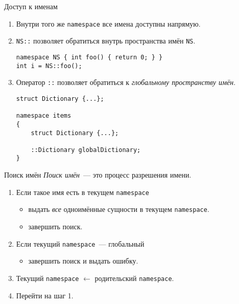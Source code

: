 \documentclass[aspectration=1610,t]{beamer}
\begin{document}
\begin{frame}[fragile]{Доступ к именам}
    \begin{enumerate}
        \item Внутри того же \texttt{namespace} все имена доступны напрямую.

        \pause\item \texttt{NS::} позволяет обратиться внутрь пространства
            имён \texttt{NS}.
    \begin{lstlisting}
namespace NS { int foo() { return 0; } }
int i = NS::foo();
    \end{lstlisting}

        \pause\item Оператор \texttt{::} позволяет обратиться к \emph{глобальному пространству имён}.
    \begin{lstlisting}
struct Dictionary {...};

namespace items 
{
    struct Dictionary {...};

    ::Dictionary globalDictionary;
}
    \end{lstlisting}
    \end{enumerate}
\end{frame}

\begin{frame}[fragile]{Поиск имён}
    \emph{Поиск имён}~--- это процесс разрешения имени.

    \begin{enumerate}
        \item Если такое имя есть в текущем \texttt{namespace}
        \begin{itemize}
        \item выдать
                    \emph{все} одноимённые сущности в текущем \texttt{namespace}.
        \item завершить поиск.
        \end{itemize} 
        
        \item Если текущий \texttt{namespace}~--- глобальный
        \begin{itemize}
                \item завершить поиск и выдать ошибку.
                \end{itemize}

        \item Текущий \texttt{namespace} $\gets$ родительский \texttt{namespace}.

        \item Перейти на шаг 1.
    \end{enumerate}
\end{frame}
\end{document}
